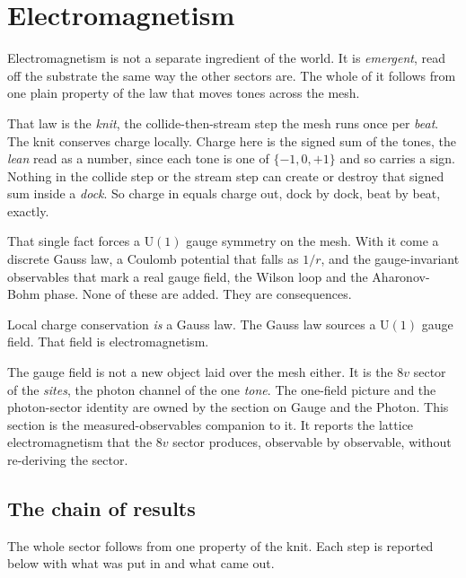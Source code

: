 \section{Electromagnetism}

Electromagnetism is not a separate ingredient of the world. It is \emph{emergent}, read off the substrate the same way the other sectors are. The whole of it follows from one plain property of the law that moves tones across the mesh.

That law is the \emph{knit}, the collide-then-stream step the mesh runs once per \emph{beat}. The knit conserves charge locally. Charge here is the signed sum of the tones, the \emph{lean} read as a number, since each tone is one of $\{-1, 0, +1\}$ and so carries a sign. Nothing in the collide step or the stream step can create or destroy that signed sum inside a \emph{dock}. So charge in equals charge out, dock by dock, beat by beat, exactly.

That single fact forces a $\mathrm{U}(1)$ gauge symmetry on the mesh. With it come a discrete Gauss law, a Coulomb potential that falls as $1/r$, and the gauge-invariant observables that mark a real gauge field, the Wilson loop and the Aharonov-Bohm phase. None of these are added. They are consequences.

\begin{principle}
Local charge conservation \emph{is} a Gauss law. The Gauss law sources a $\mathrm{U}(1)$ gauge field. That field is electromagnetism.
\end{principle}

The gauge field is not a new object laid over the mesh either. It is the $8v$ sector of the \emph{sites}, the photon channel of the one \emph{tone}. The one-field picture and the photon-sector identity are owned by the section on Gauge and the Photon. This section is the measured-observables companion to it. It reports the lattice electromagnetism that the $8v$ sector produces, observable by observable, without re-deriving the sector.

\subsection{The chain of results}

The whole sector follows from one property of the knit. Each step is reported below with what was put in and what came out.

